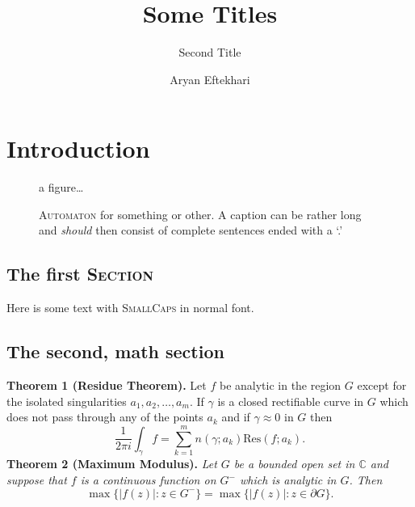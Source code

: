 \documentclass[]{usiinfdocprop}
\author{Aryan Eftekhari}
\title{Some Titles}
\subtitle{Second Title}
\begin{document}
\maketitle
\frontmatter
\tableofcontents
\mainmatter
\chapter[Short title]{Introduction}

\lipsum[2-5]

\begin{figure}
\centering
a figure\dots
\caption{\textsc{Automaton} for something or other. A caption can be rather
long and \emph{should} then consist of complete sentences ended with a `.'}
\end{figure}

\section{The first \textsc{Section}}

Here is some text with \textsc{SmallCaps} in normal font.

\lipsum[6-7]

 \section{The second, math section}
\begin{center}
\end{center}

\textbf{Theorem 1 (Residue Theorem).}
Let $f$ be analytic in the region $G$ except for the isolated singularities $a_1,a_2,\ldots,a_m$. If $\gamma$ is a closed rectifiable curve in $G$ which does not pass through any of the points $a_k$ and if $\gamma\approx 0$ in $G$ then
\[
\frac{1}{2\pi i}\int_\gamma f = \sum_{k=1}^m n(\gamma;a_k) \text{Res}(f;a_k).
\]
\textbf{Theorem 2 (Maximum Modulus).}
\emph{Let $G$ be a bounded open set in $\mathbb{C}$ and suppose that $f$ is a continuous function on $G^-$ which is analytic in $G$. Then}
\[
\max\{|f(z)|:z\in G^-\}=\max \{|f(z)|:z\in \partial G \}.
\]
\end{document}
